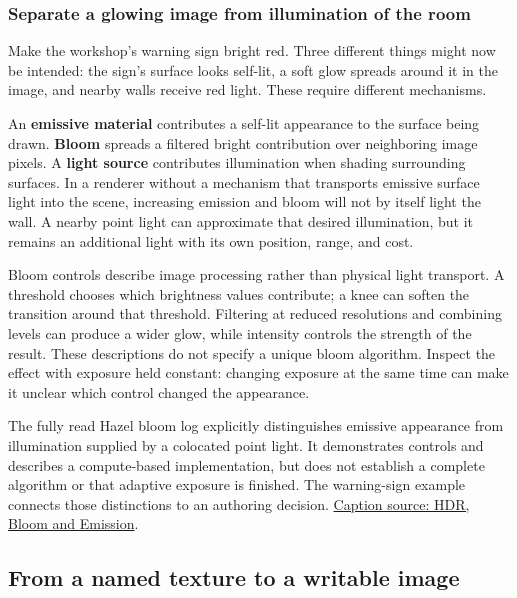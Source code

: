 \subsubsection{Separate a glowing image from illumination of the room}\label{06-engine-ii-ch026-separate-a-glowing-image-from-illumination-of-the-room}

Make the workshop's warning sign bright red. Three different things might now be intended: the sign's surface looks self-lit, a soft glow spreads around it in the image, and nearby walls receive red light. These require different mechanisms.

An \textbf{emissive material} contributes a self-lit appearance to the surface being drawn. \textbf{Bloom} spreads a filtered bright contribution over neighboring image pixels. A \textbf{light source} contributes illumination when shading surrounding surfaces. In a renderer without a mechanism that transports emissive surface light into the scene, increasing emission and bloom will not by itself light the wall. A nearby point light can approximate that desired illumination, but it remains an additional light with its own position, range, and cost.

Bloom controls describe image processing rather than physical light transport. A threshold chooses which brightness values contribute; a knee can soften the transition around that threshold. Filtering at reduced resolutions and combining levels can produce a wider glow, while intensity controls the strength of the result. These descriptions do not specify a unique bloom algorithm. Inspect the effect with exposure held constant: changing exposure at the same time can make it unclear which control changed the appearance.

The fully read Hazel bloom log explicitly distinguishes emissive appearance from illumination supplied by a colocated point light. It demonstrates controls and describes a compute-based implementation, but does not establish a complete algorithm or that adaptive exposure is finished. The warning-sign example connects those distinctions to an authoring decision. \href{https://www.youtube.com/watch?v=ThA9pueKvus}{Caption source: HDR, Bloom and Emission}.

\subsection{From a named texture to a writable image}\label{06-engine-ii-ch026-from-a-named-texture-to-a-writable-image}

